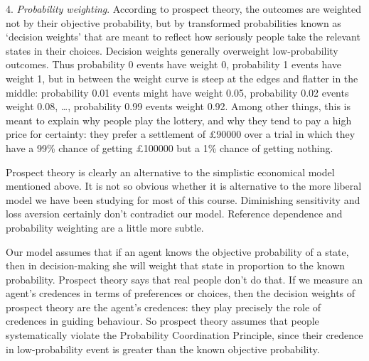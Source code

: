 4. \emph{Probability weighting}. According to prospect theory, the
outcomes are weighted not by their objective probability, but by
transformed probabilities known as `decision weights' that are meant
to reflect how seriously people take the relevant states in their
choices. Decision weights generally overweight low-probability
outcomes. Thus probability 0 events have weight 0, probability 1
events have weight 1, but in between the weight curve is steep at the edges
and flatter in the middle: probability 0.01 events might have weight
0.05, probability 0.02 events weight 0.08, \ldots, probability 0.99
events weight 0.92. Among other things, this is meant to explain why
people play the lottery, and why they tend to pay a high price for
certainty: they prefer a settlement of £90000 over a trial in which
they have a 99\% chance of getting £100000 but a 1\% chance of
getting nothing.%


Prospect theory is clearly an alternative to the simplistic economical
model mentioned above. It is not so obvious whether it is alternative
to the more liberal model we have been studying for most of this
course. Diminishing sensitivity and loss aversion certainly don't
contradict our model. Reference dependence and probability weighting
are a little more subtle.

Our model assumes that if an agent knows the objective probability of
a state, then in decision-making she will weight that state in
proportion to the known probability. Prospect theory says that real
people don't do that. If we measure an agent's credences in terms of
preferences or choices, then the decision weights of prospect theory
are the agent's credences: they play precisely the role of credences
in guiding behaviour. So prospect theory assumes that people
systematically violate the Probability Coordination Principle, since
their credence in low-probability event is greater than the known
objective probability.

